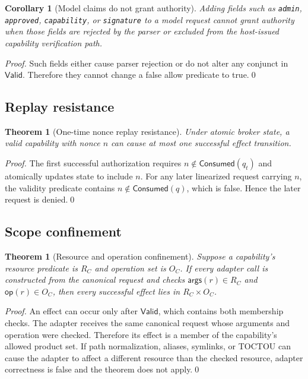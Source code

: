 \documentclass[11pt]{article}
\newtheorem{theorem}[definition]{Theorem}
\newtheorem{corollary}[definition]{Corollary}
\newcommand{\1}{\mathbf{1}}
\begin{document}
\begin{corollary}[Model claims do not grant authority]
Adding fields such as \texttt{admin}, \texttt{approved}, \texttt{capability}, or \texttt{signature} to a model request cannot grant authority when those fields are rejected by the parser or excluded from the host-issued capability verification path.
\end{corollary}
\begin{proof}
Such fields either cause parser rejection or do not alter any conjunct in $\mathsf{Valid}$. Therefore they cannot change a false allow predicate to true.\qed\end{proof}

\subsection{Replay resistance}
\begin{theorem}[One-time nonce replay resistance]
Under atomic broker state, a valid capability with nonce $n$ can cause at most one successful effect transition.
\end{theorem}
\begin{proof}
The first successful authorization requires $n\notin\mathsf{Consumed}(q_t)$ and atomically updates state to include $n$. For any later linearized request carrying $n$, the validity predicate contains $n\notin\mathsf{Consumed}(q)$, which is false. Hence the later request is denied.\qed\end{proof}

\subsection{Scope confinement}
\begin{theorem}[Resource and operation confinement]
Suppose a capability's resource predicate is $R_C$ and operation set is $O_C$. If every adapter call is constructed from the canonical request and checks $\mathsf{args}(r)\in R_C$ and $\mathsf{op}(r)\in O_C$, then every successful effect lies in $R_C\times O_C$.
\end{theorem}
\begin{proof}
An effect can occur only after $\mathsf{Valid}$, which contains both membership checks. The adapter receives the same canonical request whose arguments and operation were checked. Therefore its effect is a member of the capability's allowed product set. If path normalization, aliases, symlinks, or TOCTOU can cause the adapter to affect a different resource than the checked resource, adapter correctness is false and the theorem does not apply.\qed\end{proof}
\end{document}
